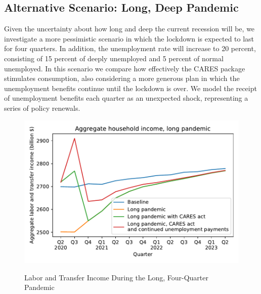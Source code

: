 \documentclass[titlepage,a4paper]{\econtex}
\begin{document}
\subsection{Alternative Scenario: Long, Deep Pandemic} \label{sec:longPandemic}

Given the uncertainty about how long and deep the current recession will be, we investigate a more pessimistic scenario in which the lockdown is expected to last for four quarters.
In addition, the unemployment rate will increase to 20 percent, consisting of 15 percent of deeply unemployed and 5 percent of normal unemployed.
In this scenario we compare how effectively the CARES package stimulates consumption, also considering a more generous plan in which the unemployment benefits continue until the lockdown is over.
We model the receipt of unemployment benefits each quarter as an unexpected shock, representing a series of policy renewals.

\begin{figure}
  \centering
  \caption{Labor and Transfer Income During the Long, Four-Quarter Pandemic}
  \label{inc_response_pandemic}
  { \includegraphics[width=8in]{./Figures/AggLT_long_pandemic}}
\end{figure}
\end{document}
